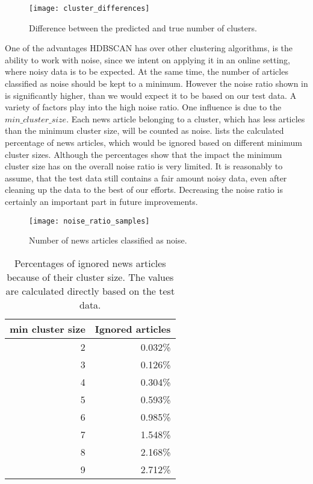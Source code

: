 \begin{figure}[h]
    \centering
    \texttt{[image: cluster\_differences]}
    \caption{Difference between the predicted and true number of clusters.}
    \label{fig:cluster_differences}
\end{figure}

One of the advantages HDBSCAN has over other clustering algorithms,
is the ability to work with noise, since we intent on applying it in an online setting,
where noisy data is to be expected.
At the same time, the number of articles classified as noise should be kept to a minimum.
However the noise ratio shown in  is significantly higher,
than we would expect it to be based on our test data.
A variety of factors play into the high noise ratio.
One influence is due to the $min\_cluster\_size$.
Each news article belonging to a cluster, which has less articles than the minimum cluster size, will be counted as noise.
 lists the calculated percentage of news articles,
which would be ignored based on different minimum cluster sizes.
Although the percentages show that the impact the minimum cluster size has on the overall noise ratio is very limited.
It is reasonably to assume, that the test data still contains a fair amount noisy data,
even after cleaning up the data to the best of our efforts.
Decreasing the noise ratio is certainly an important part in future improvements.

\begin{figure}[h]
    \centering
    \texttt{[image: noise\_ratio\_samples]}
    \caption{Number of news articles classified as noise.}
    \label{fig:noise_ratio_samples}
\end{figure}

\begin{table}[h]
    \centering
    \begin{tabular}{|r|r|}
        \hline
        \textbf{min cluster size} & \textbf{Ignored articles} \\
        \hline
        2 & 0.032\% \\ \hline
        3 & 0.126\% \\ \hline
        4 & 0.304\% \\ \hline
        5 & 0.593\% \\ \hline
        6 & 0.985\% \\ \hline
        7 & 1.548\% \\ \hline
        8 & 2.168\% \\ \hline
        9 & 2.712\% \\ \hline
    \end{tabular}
    \caption{Percentages of ignored news articles because of their cluster size. The values are calculated directly based on the test data.}
    \label{tab:expected_noise}
\end{table}

